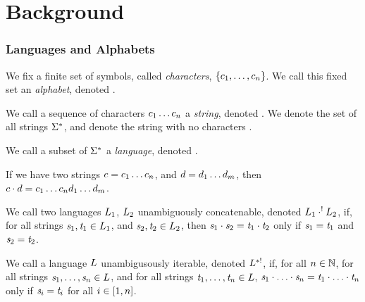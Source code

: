 \section{Background}

\subsubsection{Languages and Alphabets}

\begin{definition}
We fix a finite set of symbols, called \textit{characters}, $\{c_1,\ldots,c_n\}$.
We call this fixed set an \textit{alphabet}, denoted \Alphabet{}.
\end{definition}

\begin{definition}
We call a sequence of characters $c_1\ldots c_n$ a
\textit{string}, denoted \String{}.
We denote the set of all strings $\Sigma^*$, and denote the string
with no characters \EmptyString{}.
\end{definition}

\begin{definition}
We call a subset of $\Sigma^*$ a \textit{language},
denoted \Language{}.
\end{definition}

\begin{definition}
If we have two strings $c=c_1\ldots c_n$,
and $d=d_1\ldots d_m$,
then $c\cdot d=c_1\ldots c_nd_1\ldots d_m$.
\end{definition}

\begin{definition}
We call two languages $L_1$, $L_2$ unambiguously concatenable,
denoted $L_1 \cdot^! L_2$,
if, for all strings $\mathit{s}_1,\mathit{t}_1\in L_1$,
and $\mathit{s}_2,\mathit{t}_2\in L_2$, then
$\mathit{s}_1\cdot\mathit{s}_2=\mathit{t}_1\cdot\mathit{t}_2$
only if $\mathit{s}_1=\mathit{t}_1$ and $\mathit{s}_2=\mathit{t}_2$.
\end{definition}

\begin{definition}
We call a language $L$ unambigusously iterable,
denoted $L{}^{*!}$,
if, for all $n\in\mathbb{N}$, for all strings $\mathit{s}_1,\ldots,\mathit{s}_n\in L$,
and for all strings $\mathit{t}_1,\ldots,\mathit{t}_n\in L$,
$\mathit{s}_1\cdot\ldots\cdot\mathit{s}_n=\mathit{t}_1\cdot\ldots\cdot\mathit{t}_n$
only if $\mathit{s}_i=\mathit{t}_i$ for all $i\in[1,n]$.
\end{definition}

